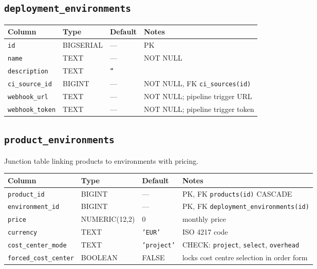 \documentclass[12pt,a4paper,twoside]{report}
\newcommand{\code}[1]{\texttt{#1}}
\begin{document}
\subsection*{\texttt{deployment\_environments}}

\begin{table}[H]
  \centering\small
  \begin{tabular}{@{}llll@{}}
    \toprule
    \textbf{Column} & \textbf{Type} & \textbf{Default} & \textbf{Notes} \\
    \midrule
    \code{id}              & BIGSERIAL & ---       & PK \\
    \code{name}            & TEXT      & ---       & NOT NULL \\
    \code{description}     & TEXT      & \code{''} & \\
    \code{ci\_source\_id}  & BIGINT    & ---       & NOT NULL, FK \textrightarrow{} \code{ci\_sources(id)} \\
    \code{webhook\_url}    & TEXT      & ---       & NOT NULL; pipeline trigger URL \\
    \code{webhook\_token}  & TEXT      & ---       & NOT NULL; pipeline trigger token \\
    \bottomrule
  \end{tabular}
\end{table}

\subsection*{\texttt{product\_environments}}

Junction table linking products to environments with pricing.

\begin{table}[H]
  \centering\small
  \begin{tabular}{@{}llll@{}}
    \toprule
    \textbf{Column} & \textbf{Type} & \textbf{Default} & \textbf{Notes} \\
    \midrule
    \code{product\_id}        & BIGINT        & ---          & PK, FK \textrightarrow{} \code{products(id)} CASCADE \\
    \code{environment\_id}    & BIGINT        & ---          & PK, FK \textrightarrow{} \code{deployment\_environments(id)} \\
    \code{price}              & NUMERIC(12,2) & 0            & monthly price \\
    \code{currency}           & TEXT          & \code{'EUR'} & ISO 4217 code \\
    \code{cost\_center\_mode} & TEXT          & \code{'project'} & CHECK: \code{project}, \code{select}, \code{overhead} \\
    \code{forced\_cost\_center}& BOOLEAN      & FALSE        & locks cost centre selection in order form \\
    \bottomrule
  \end{tabular}
\end{table}
\end{document}
